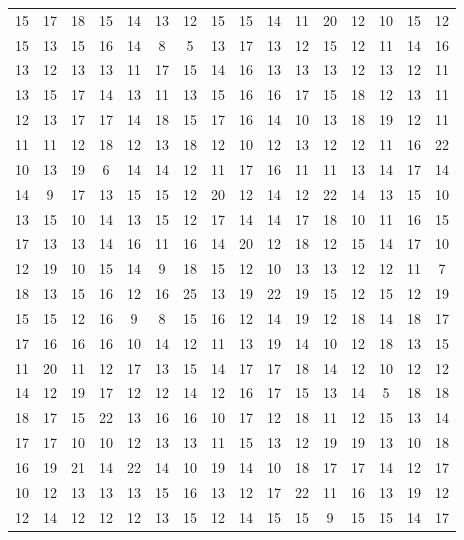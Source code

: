 \documentclass[a4paper]{article}
\begin{document}
\begin{longtable}{ c c c c c c c c c c c c c c c c }
    15 & 17 & 18 & 15 & 14 & 13 & 12 & 15 & 15 & 14 & 11 & 20 & 12 & 10 & 15 & 12 \\
	15 & 13 & 15 & 16 & 14 & 8 & 5 & 13 & 17 & 13 & 12 & 15 & 12 & 11 & 14 & 16 \\
	13 & 12 & 13 & 13 & 11 & 17 & 15 & 14 & 16 & 13 & 13 & 13 & 12 & 13 & 12 & 11 \\
	13 & 15 & 17 & 14 & 13 & 11 & 13 & 15 & 16 & 16 & 17 & 15 & 18 & 12 & 13 & 11 \\
	12 & 13 & 17 & 17 & 14 & 18 & 15 & 17 & 16 & 14 & 10 & 13 & 18 & 19 & 12 & 11 \\
	11 & 11 & 12 & 18 & 12 & 13 & 18 & 12 & 10 & 12 & 13 & 12 & 12 & 11 & 16 & 22 \\
	10 & 13 & 19 & 6 & 14 & 14 & 12 & 11 & 17 & 16 & 11 & 11 & 13 & 14 & 17 & 14 \\
	14 & 9 & 17 & 13 & 15 & 15 & 12 & 20 & 12 & 14 & 12 & 22 & 14 & 13 & 15 & 10 \\
	13 & 15 & 10 & 14 & 13 & 15 & 12 & 17 & 14 & 14 & 17 & 18 & 10 & 11 & 16 & 15 \\
	17 & 13 & 13 & 14 & 16 & 11 & 16 & 14 & 20 & 12 & 18 & 12 & 15 & 14 & 17 & 10 \\
	12 & 19 & 10 & 15 & 14 & 9 & 18 & 15 & 12 & 10 & 13 & 13 & 12 & 12 & 11 & 7 \\
	18 & 13 & 15 & 16 & 12 & 16 & 25 & 13 & 19 & 22 & 19 & 15 & 12 & 15 & 12 & 19 \\
	15 & 15 & 12 & 16 & 9 & 8 & 15 & 16 & 12 & 14 & 19 & 12 & 18 & 14 & 18 & 17 \\
	17 & 16 & 16 & 16 & 10 & 14 & 12 & 11 & 13 & 19 & 14 & 10 & 12 & 18 & 13 & 15 \\
	11 & 20 & 11 & 12 & 17 & 13 & 15 & 14 & 17 & 17 & 18 & 14 & 12 & 10 & 12 & 12 \\
	14 & 12 & 19 & 17 & 12 & 12 & 14 & 12 & 16 & 17 & 15 & 13 & 14 & 5 & 18 & 18 \\
	18 & 17 & 15 & 22 & 13 & 16 & 16 & 10 & 17 & 12 & 18 & 11 & 12 & 15 & 13 & 14 \\
	17 & 17 & 10 & 10 & 12 & 13 & 13 & 11 & 15 & 13 & 12 & 19 & 19 & 13 & 10 & 18 \\
	16 & 19 & 21 & 14 & 22 & 14 & 10 & 19 & 14 & 10 & 18 & 17 & 17 & 14 & 12 & 17 \\
	10 & 12 & 13 & 13 & 13 & 15 & 16 & 13 & 12 & 17 & 22 & 11 & 16 & 13 & 19 & 12 \\
	12 & 14 & 12 & 12 & 12 & 13 & 15 & 12 & 14 & 15 & 15 & 9 & 15 & 15 & 14 & 17 \\

\end{longtable}
\end{document}

